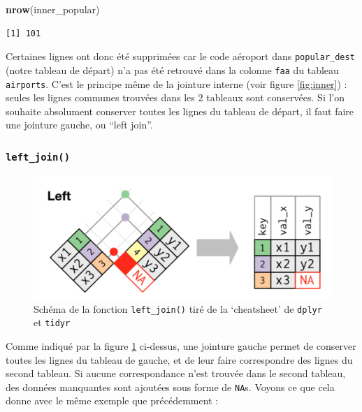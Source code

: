 \documentclass[a4paperpaper,]{article}
\newenvironment{Shaded}{\begin{snugshade}}{\end{snugshade}}
\newcommand{\KeywordTok}[1]{\textcolor[rgb]{0.13,0.29,0.53}{\textbf{#1}}}
\newcommand{\DataTypeTok}[1]{\textcolor[rgb]{0.13,0.29,0.53}{#1}}
\newcommand{\StringTok}[1]{\textcolor[rgb]{0.31,0.60,0.02}{#1}}
\newcommand{\OperatorTok}[1]{\textcolor[rgb]{0.81,0.36,0.00}{\textbf{#1}}}
\newcommand{\NormalTok}[1]{#1}
\theoremstyle{definition}
\theoremstyle{definition}
\theoremstyle{definition}
\theoremstyle{remark}
\begin{document}
\begin{Shaded}
\begin{Highlighting}[]
\KeywordTok{nrow}\NormalTok{(inner_popular)}
\end{Highlighting}
\end{Shaded}

\begin{verbatim}
[1] 101
\end{verbatim}

Certaines lignes ont donc été supprimées car le code aéroport dans
\texttt{popular\_dest} (notre tableau de départ) n'a pas été retrouvé
dans la colonne \texttt{faa} du tableau \texttt{airports}. C'est le
principe même de la jointure interne (voir figure \ref{fig:inner}) :
seules les lignes communes trouvées dans les 2 tableaux sont conservées.
Si l'on souhaite absolument conserver toutes les lignes du tableau de
départ, il faut faire une jointure gauche, ou ``left join''.

\subsubsection{\texorpdfstring{\texttt{left\_join()}}{left\_join()}}\label{left_join}

\begin{figure}[htpb]

{\centering \includegraphics[width=0.5\linewidth]{images/leftjoin} 

}

\caption{Schéma de la fonction \texttt{left\_join()} tiré de la
`cheatsheet' de \texttt{dplyr} et \texttt{tidyr}}\label{fig:left}
\end{figure}




Comme indiqué par la figure \ref{fig:left} ci-dessus, une jointure
gauche permet de conserver toutes les lignes du tableau de gauche, et de
leur faire correspondre des lignes du second tableau. Si aucune
correspondance n'est trouvée dans le second tableau, des données
manquantes sont ajoutées sous forme de \texttt{NA}s. Voyons ce que cela
donne avec le même exemple que précédemment :

\begin{Shaded}
\end{Shaded}
\end{document}
